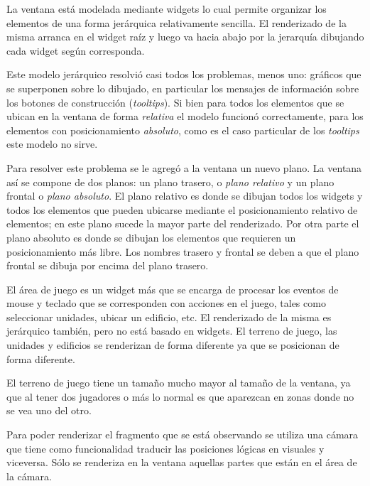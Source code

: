 \documentclass[titlepage,a4paper,12pt]{article}
\begin{document}
La ventana está modelada mediante widgets lo cual permite organizar los elementos de una forma jerárquica relativamente sencilla. El renderizado de la misma arranca en el widget raíz y luego va hacia abajo por la jerarquía dibujando cada widget según corresponda. 

Este modelo jerárquico resolvió casi todos los problemas, menos uno: gráficos que se superponen sobre lo dibujado, en particular los mensajes de información sobre los botones de construcción (\textit{tooltips}). Si bien para todos los elementos que se ubican en la ventana de forma \textit{relativa} el modelo funcionó correctamente, para los elementos con posicionamiento \textit{absoluto}, como es el caso particular de los \textit{tooltips} este modelo no sirve. 

Para resolver este problema se le agregó a la ventana un nuevo plano. La ventana así se compone de dos planos: un plano trasero, o \textit{plano relativo} y un plano frontal o \textit{plano absoluto}. El plano relativo es donde se dibujan todos los widgets y todos los elementos que pueden ubicarse mediante el posicionamiento relativo de elementos; en este plano sucede la mayor parte del renderizado. Por otra parte el plano absoluto es donde se dibujan los elementos que requieren un posicionamiento más libre.
Los nombres trasero y frontal se deben a que el plano frontal se dibuja por encima del plano trasero.

El área de juego es un widget más que se encarga de procesar los eventos de mouse y teclado que se corresponden con acciones en el juego, tales como seleccionar unidades, ubicar un edificio, etc. 
El renderizado de la misma es jerárquico también, pero no está basado en widgets. El terreno de juego, las unidades y edificios se renderizan de forma diferente ya que se posicionan de forma diferente.

El terreno de juego tiene un tamaño mucho mayor al tamaño de la ventana, ya que al tener dos jugadores o más lo normal es que aparezcan en zonas donde no se vea uno del otro. 

Para poder renderizar el fragmento que se está observando se utiliza una cámara que tiene como funcionalidad traducir las posiciones lógicas en visuales y viceversa. Sólo se renderiza en la ventana aquellas partes que están en el área de la cámara. 
\end{document}
